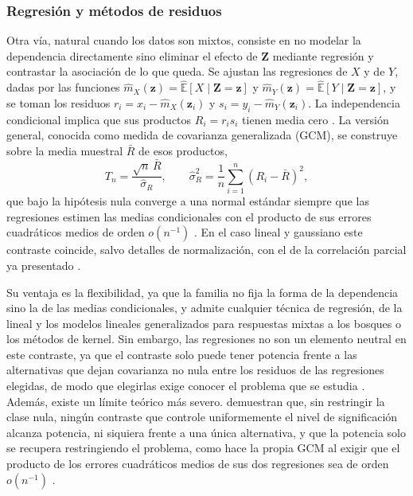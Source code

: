 \subsubsection{Regresión y métodos de residuos}   %
Otra vía, natural cuando los datos son mixtos, consiste en no modelar la dependencia
directamente sino eliminar el efecto de $\mathbf{Z}$ mediante regresión y contrastar la
asociación de lo que queda. Se ajustan las regresiones de $X$ y de $Y$, dadas por las funciones $\hat{m}_X(\mathbf{z}) = \widehat{\mathbb{E}}[X \mid \mathbf{Z} = \mathbf{z}]$ y
$\hat{m}_Y(\mathbf{z}) = \widehat{\mathbb{E}}[Y \mid \mathbf{Z} = \mathbf{z}]$, y se toman los residuos $r_i = x_i - \hat{m}_X(\mathbf{z}_i)$ y $s_i = y_i - \hat{m}_Y(\mathbf{z}_i)$. La independencia condicional implica que sus
productos $R_i = r_i s_i$ tienen media cero \citep{shah2020gcm}. La versión general, conocida como medida de
covarianza generalizada (GCM), se construye sobre la media muestral $\bar{R}$ de esos
productos,
\[
T_n = \frac{\sqrt{n}\,\bar{R}}{\hat\sigma_R},
\qquad
\hat\sigma_R^2 = \frac{1}{n}\sum_{i=1}^n (R_i - \bar{R})^2,
\]
que bajo la hipótesis nula converge a una normal estándar siempre que las regresiones
estimen las medias condicionales con el producto de sus errores cuadráticos medios de
orden $o(n^{-1})$ \citep{shah2020gcm}. En el caso lineal y gaussiano este contraste
coincide, salvo detalles de normalización, con el de la correlación parcial ya presentado
\citep{shah2020gcm}.

Su ventaja es la flexibilidad, ya que la familia no fija la forma de la dependencia sino
la de las medias condicionales, y admite cualquier técnica de regresión, de la lineal y
los modelos lineales generalizados para respuestas mixtas a los bosques o los métodos de
kernel. Sin embargo, las regresiones no son un elemento neutral en este contraste, ya que el contraste solo puede tener potencia frente a las alternativas que dejan covarianza no nula entre los residuos de
las regresiones elegidas, de modo que elegirlas exige conocer el problema que se estudia \citep{shah2020gcm}. Además, existe un límite teórico más severo. \citet{shah2020gcm} demuestran que, sin restringir la clase nula, ningún contraste que controle uniformemente el nivel de
significación alcanza potencia, ni siquiera frente a una única alternativa, y que la
potencia solo se recupera restringiendo el problema, como hace la propia GCM al exigir que el producto de los errores cuadráticos medios de sus dos regresiones sea de orden $o(n^{-1})$ \citep{shah2020gcm}.

